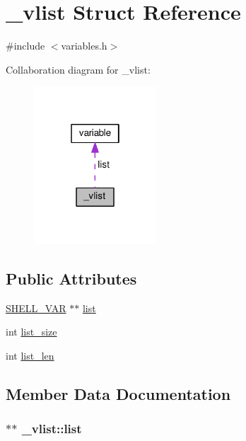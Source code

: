 \hypertarget{struct__vlist}{}\section{\+\_\+vlist Struct Reference}
\label{struct__vlist}


{\ttfamily \#include $<$variables.\+h$>$}



Collaboration diagram for \+\_\+vlist\+:
\nopagebreak
\begin{figure}[H]
\begin{center}
\leavevmode
\includegraphics[width=130pt]{struct__vlist__coll__graph}
\end{center}
\end{figure}
\subsection*{Public Attributes}
\begin{DoxyCompactItemize}
\item 
\hyperlink{variables_8h_aba7363ba59b9546110e58106ad60cb50}{S\+H\+E\+L\+L\+\_\+\+V\+AR} $\ast$$\ast$ \hyperlink{struct__vlist_a799b25ce65fe2f50ea530e137b66a433}{list}
\item 
int \hyperlink{struct__vlist_ac99f755431acd1c5d178f3220ac41524}{list\+\_\+size}
\item 
int \hyperlink{struct__vlist_a2e7e3bd943f8651f699c1d724efcb3db}{list\+\_\+len}
\end{DoxyCompactItemize}


\subsection{Member Data Documentation}
\subsubsection[{\texorpdfstring{list}{list}}]{$\ast$$\ast$ \+\_\+vlist\+::list}\hypertarget{struct__vlist_a799b25ce65fe2f50ea530e137b66a433}{}\label{struct__vlist_a799b25ce65fe2f50ea530e137b66a433}
